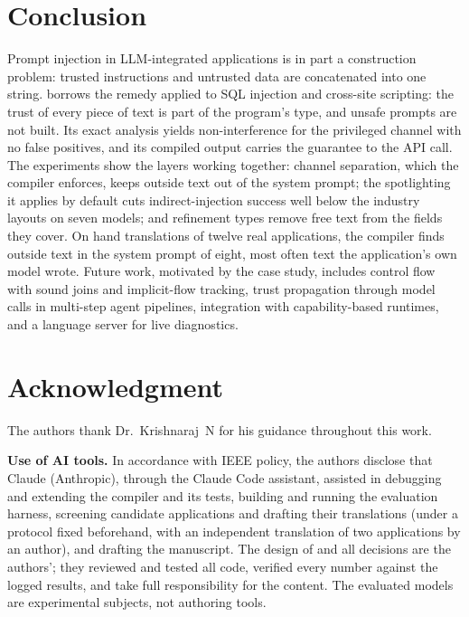 \documentclass[conference]{IEEEtran}
\begin{document}
\section{Conclusion}

Prompt injection in LLM-integrated applications is in part a construction problem: trusted instructions and untrusted data are concatenated into one string. \TL{} borrows the remedy applied to SQL injection and cross-site scripting: the trust of every piece of text is part of the program's type, and unsafe prompts are not built. Its exact analysis yields non-interference for the privileged channel with no false positives, and its compiled output carries the guarantee to the API call. The experiments show the layers working together: channel separation, which the compiler enforces, keeps outside text out of the system prompt; the spotlighting it applies by default cuts indirect-injection success well below the industry layouts on seven models; and refinement types remove free text from the fields they cover. On hand translations of twelve real applications, the compiler finds outside text in the system prompt of eight, most often text the application's own model wrote. Future work, motivated by the case study, includes control flow with sound joins and implicit-flow tracking, trust propagation through model calls in multi-step agent pipelines, integration with capability-based runtimes, and a language server for live diagnostics.

\section*{Acknowledgment}

The authors thank Dr.~Krishnaraj~N for his guidance throughout this work.

\textbf{Use of AI tools.} In accordance with IEEE policy, the authors disclose that Claude (Anthropic), through the Claude Code assistant, assisted in debugging and extending the compiler and its tests, building and running the evaluation harness, screening candidate applications and drafting their translations (under a protocol fixed beforehand, with an independent translation of two applications by an author), and drafting the manuscript. The design of \TL{} and all decisions are the authors'; they reviewed and tested all code, verified every number against the logged results, and take full responsibility for the content. The evaluated models are experimental subjects, not authoring tools.



\end{document}
